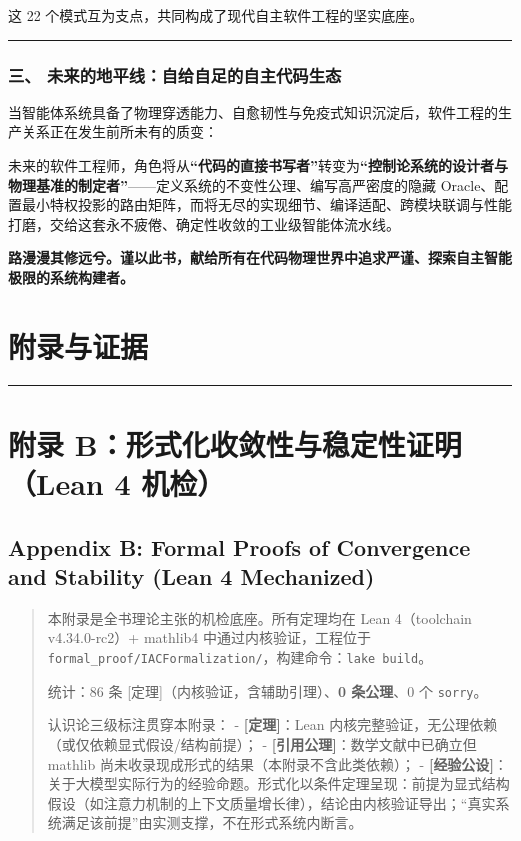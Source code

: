这 22 个模式互为支点，共同构成了现代自主软件工程的坚实底座。

\begin{center}\rule{0.5\linewidth}{0.5pt}\end{center}

\subsubsection{三、
未来的地平线：自给自足的自主代码生态}\label{ux4e09-ux672aux6765ux7684ux5730ux5e73ux7ebfux81eaux7ed9ux81eaux8db3ux7684ux81eaux4e3bux4ee3ux7801ux751fux6001}

当智能体系统具备了物理穿透能力、自愈韧性与免疫式知识沉淀后，软件工程的生产关系正在发生前所未有的质变：

未来的软件工程师，角色将从\textbf{``代码的直接书写者''}转变为\textbf{``控制论系统的设计者与物理基准的制定者''}------定义系统的不变性公理、编写高严密度的隐藏
Oracle、配置最小特权投影的路由矩阵，而将无尽的实现细节、编译适配、跨模块联调与性能打磨，交给这套永不疲倦、确定性收敛的工业级智能体流水线。

\textbf{路漫漫其修远兮。谨以此书，献给所有在代码物理世界中追求严谨、探索自主智能极限的系统构建者。}

\section{附录与证据}\label{ux9644ux5f55ux4e0eux8bc1ux636e}

\begin{center}\rule{0.5\linewidth}{0.5pt}\end{center}

\section{附录 B：形式化收敛性与稳定性证明（Lean 4
机检）}\label{ux9644ux5f55-bux5f62ux5f0fux5316ux6536ux655bux6027ux4e0eux7a33ux5b9aux6027ux8bc1ux660elean-4-ux673aux68c0}

\subsection{Appendix B: Formal Proofs of Convergence and Stability (Lean
4
Mechanized)}\label{appendix-b-formal-proofs-of-convergence-and-stability-lean-4-mechanized}

\begin{quote}
本附录是全书理论主张的机检底座。所有定理均在 Lean 4（toolchain
v4.34.0-rc2）+ mathlib4 中通过内核验证，工程位于
\texttt{formal\_proof/IACFormalization/}，构建命令：\texttt{lake\ build}。

统计：86 条 {[}定理{]}（内核验证，含辅助引理）、\textbf{0 条公理}、0 个
\texttt{sorry}。

认识论三级标注贯穿本附录： - \textbf{{[}定理{]}}：Lean
内核完整验证，无公理依赖（或仅依赖显式假设/结构前提）； -
\textbf{{[}引用公理{]}}：数学文献中已确立但 mathlib
尚未收录现成形式的结果（本附录不含此类依赖）； -
\textbf{{[}经验公设{]}}：关于大模型实际行为的经验命题。形式化以条件定理呈现：前提为显式结构假设（如注意力机制的上下文质量增长律），结论由内核验证导出；``真实系统满足该前提''由实测支撑，不在形式系统内断言。
\end{quote}

